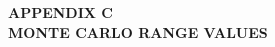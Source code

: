 \clearpage
\doublespacing
\vspace*{\fill} 
\begin{center}
\textbf{APPENDIX C}\label{appendixC}\\
\medskip
\textbf{MONTE CARLO RANGE VALUES}\\
\end{center}
\vspace{7pt}
\vspace*{\fill}
\singlespacing